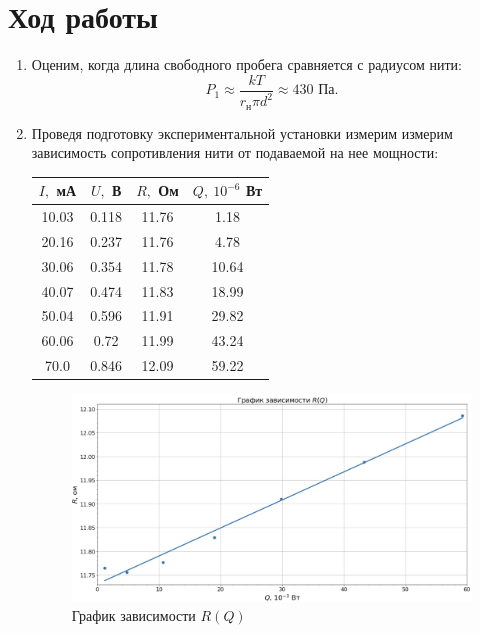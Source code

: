 \documentclass[a4paper,12pt]{article}
\theoremstyle{definition}
\begin{document}
	\section{Ход работы}
	\begin{enumerate}
		\item Оценим, когда длина свободного пробега сравняется с радиусом нити:
		\begin{equation*}
			P_1 \approx \frac{kT}{r_{н} \pi d^2}\approx 430\text{ Па}.
		\end{equation*}
	\item Проведя подготовку экспериментальной установки измерим измерим зависимость сопротивления нити от подаваемой на нее мощности:
	\begin{table}[H]
		\begin{center}
			\begin{tabular}{|c|c|c|c|}
				\hline
				$I,$ мА & $U,$ В& $R,$ Ом & $Q,\: 10^{-6}$ Вт \\ \hline
				10.03 & 0.118 & 11.76 & 1.18 \\ \hline
				20.16 & 0.237 & 11.76 & 4.78 \\ \hline
				30.06 & 0.354 & 11.78 & 10.64 \\ \hline
				40.07 & 0.474 & 11.83 & 18.99 \\ \hline
				50.04 & 0.596 & 11.91 & 29.82 \\ \hline
				60.06 & 0.72 & 11.99 & 43.24 \\ \hline
				70.0 & 0.846 & 12.09 & 59.22 \\ \hline
			\end{tabular}
		\end{center}
	\end{table}
	\begin{figure}[!h]
		\centering
		\includegraphics[scale = 0.55]{rq}
		\caption{График зависимости $R(Q)$}
		\label{graph1}
	\end{figure}

\end{enumerate}
\end{document}
